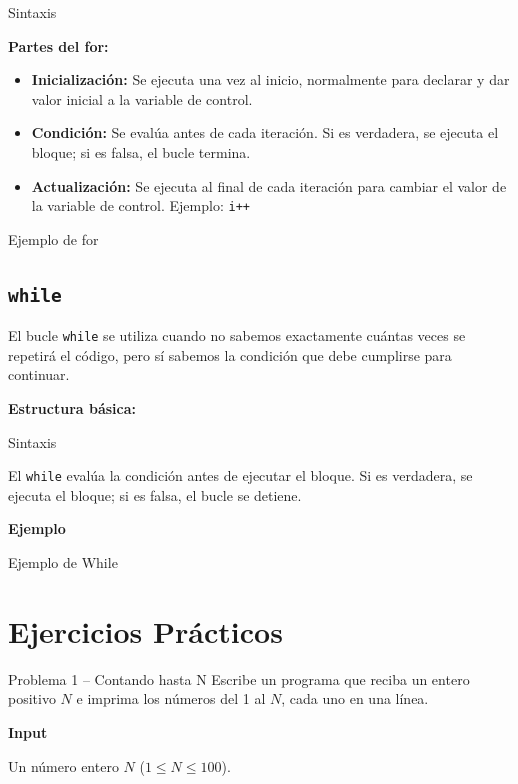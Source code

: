\documentclass{article}
\newcommand{\cppfile}[2][]{
    \begin{container}{\faCode \space \space  #1}
        
    \end{container}
}
\begin{document}
\cppfile[Sintaxis]{codes/buclefor1.cpp}

\textbf{Partes del for:}
\begin{itemize}
    \item \textbf{Inicialización:} Se ejecuta una vez al inicio, normalmente para declarar y dar valor inicial a la variable de control.
    \item \textbf{Condición:} Se evalúa antes de cada iteración. Si es verdadera, se ejecuta el bloque; si es falsa, el bucle termina.
    \item \textbf{Actualización:} Se ejecuta al final de cada iteración para cambiar el valor de la variable de control.
        Ejemplo: \texttt{i++}
\end{itemize}


\cppfile[Ejemplo de for]{codes/ejemplofor.cpp}

\vspace{0.5cm}

\subsection{\texttt{while}}

El bucle \texttt{while} se utiliza cuando no sabemos exactamente cuántas veces se repetirá el código, pero sí sabemos la condición que debe cumplirse para continuar.

\textbf{Estructura básica:}
\cppfile[Sintaxis]{codes/buclewhile1.cpp}

El \texttt{while} evalúa la condición antes de ejecutar el bloque. Si es verdadera, se ejecuta el bloque; si es falsa, el bucle se detiene.

\textbf{Ejemplo}
\cppfile[Ejemplo de While]{codes/while.cpp}
\section{Ejercicios Prácticos}

\begin{container}{Problema 1 – Contando hasta N}
Escribe un programa que reciba un entero positivo $N$ e imprima los números del 1 al $N$, cada uno en una línea.
\end{container}

\textbf{Input}

Un número entero $N$ ($1 \leq N \leq 100$).
\end{document}
